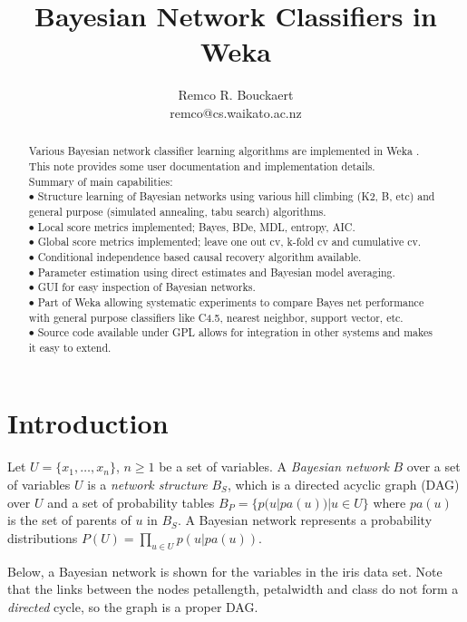 \documentclass{article}
\title{Bayesian Network Classifiers in Weka}
\author{Remco R. Bouckaert\\remco@cs.waikato.ac.nz}
\begin{document}
\maketitle

\begin{abstract}
Various Bayesian network classifier learning algorithms are implemented in Weka \cite{weka}.
This note provides some user documentation and implementation details.\\
Summary of main capabilities:\\
$\bullet$ Structure learning of Bayesian networks using various hill climbing (K2, B, etc) and
general purpose (simulated annealing, tabu search) algorithms.\\
$\bullet$ Local score metrics implemented; Bayes, BDe, MDL, entropy, AIC.\\
$\bullet$ Global score metrics implemented; leave one out cv, k-fold cv and cumulative cv.\\
$\bullet$ Conditional independence based causal recovery algorithm available.\\
$\bullet$ Parameter estimation using direct estimates and Bayesian model averaging.\\
$\bullet$ GUI for easy inspection of Bayesian networks.\\
$\bullet$ Part of Weka allowing systematic experiments to compare Bayes net performance with general 
purpose classifiers like C4.5, nearest neighbor, support vector, etc.\\
$\bullet$ Source code available under GPL allows for integration in other systems and 
makes it easy to extend.\\
\end{abstract}

\tableofcontents

\section{Introduction}

Let $U=\{x_1,\ldots,x_n\}$, $n\ge 1$ be a set of variables.
%
A {\em Bayesian network} $B$ over a set of variables $U$ is a {\em
network  structure} $B_S$, which is a directed acyclic graph (DAG)
over $U$ and a set of  probability tables $B_P = \{p(u|pa(u)) | u\in
U\}$ where $pa(u)$ is the set of parents of $u$ in $B_S$. A Bayesian
network represents a probability distributions $P(U) = \prod_{u\in
U}p(u|pa(u))$.

Below, a Bayesian network is shown for the variables in the iris data set.
Note that the links between the nodes petallength, petalwidth and class 
do not form a {\em directed} cycle, so the graph is a proper DAG.
\end{document}
